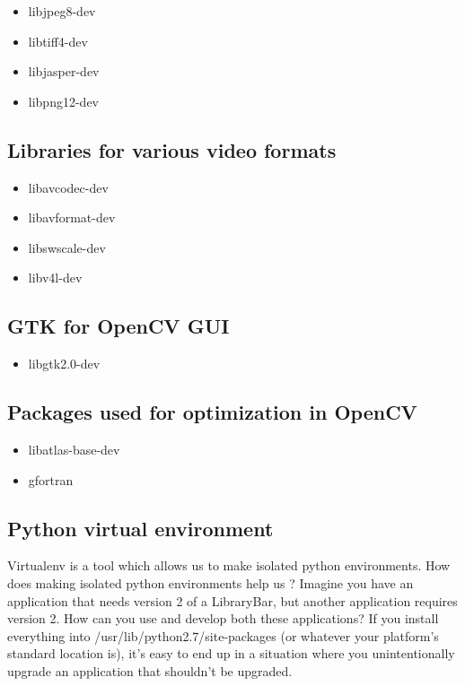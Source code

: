 \documentclass[BTech]{srmuthesis}
\begin{document}
\begin{itemize}
    \item libjpeg8-dev
    \item libtiff4-dev
    \item libjasper-dev
    \item libpng12-dev
\end{itemize}

\subsection{Libraries for various video formats}

\begin{itemize}
    \item libavcodec-dev
    \item libavformat-dev
    \item libswscale-dev
    \item libv4l-dev
\end{itemize}

\subsection{GTK for OpenCV GUI}

\begin{itemize}
    \item libgtk2.0-dev
\end{itemize}

\subsection{Packages used for optimization in OpenCV}

\begin{itemize}
    \item libatlas-base-dev
    \item gfortran
\end{itemize}

\subsection{Python virtual environment}

Virtualenv is a tool which allows us to make isolated python environments. How does making isolated python environments help us ? Imagine you have an application that needs version 2 of a LibraryBar, but another application requires version 2. How can you use and develop both these applications? If you install everything into /usr/lib/python2.7/site-packages (or whatever your platform’s standard location is), it’s easy to end up in a situation where you unintentionally upgrade an application that shouldn’t be upgraded.
\end{document}
